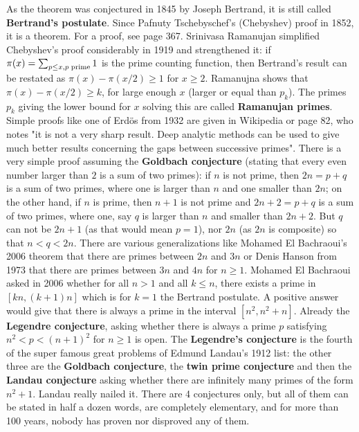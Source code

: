 \documentclass[12pt]{amsart}
\begin{document}
As the theorem was conjectured in 1845 by Joseph Bertrand, it is still called {\bf Bertrand's postulate}.
Since Pafnuty Tschebyschef's (Chebyshev) proof in 1852, it is a theorem.
For a proof, see \cite{NivenZuckermanMontgomery}  page 367.
Srinivasa Ramanujan simplified Chebyshev's proof considerably in 1919 and strengthened
it: if $\pi(x) = \sum_{p \leq x, p \; {\rm prime}} 1$ is the {\rm prime counting function}, then
Bertrand's result can be restated as $\pi(x)-\pi(x/2) \geq 1$ for $x \geq 2$.
Ramanujna shows that $\pi(x)-\pi(x/2) \geq k$, for large enough $x$ (larger or equal than $p_k$).
The primes $p_k$ giving the lower bound for $x$ solving this are called {\bf Ramanujan primes}.
Simple proofs like one of Erd\"os from 1932 are given in Wikipedia or
\cite{Hua1982} page 82, who notes "it is not a very sharp result. Deep analytic
methods can be used to give much better results concerning the gaps between successive primes".
There is a very simple proof assuming the {\bf Goldbach conjecture} (stating that
every even number larger than $2$ is a sum of two primes): \cite{RicardoGoldbach}
if $n$ is not prime, then $2n=p+q$ is a sum of two primes, where one
is larger than $n$ and one smaller than $2n$; on the other hand, if $n$ is prime, 
then $n+1$ is not prime and $2n+2=p+q$ is a sum of two primes, where one, say
$q$ is larger than $n$ and smaller than $2n+2$. But $q$ can not be $2n+1$ (as
that would mean $p=1$), nor $2n$ (as $2n$ is composite) so that $n<q<2n$. 
There are various generalizations like Mohamed El Bachraoui's 2006 theorem that there are primes
between $2n$ and $3n$ or Denis Hanson from 1973 \cite{Hanson1973} that there are primes
between $3n$ and $4n$ for $n \geq 1$. Mohamed El Bachraoui asked in 2006 whether
for all $n>1$ and all $k \leq n$, there exists a prime in $[kn,(k+1)n]$ which is
for $k=1$ the Bertrand postulate. A positive answer would give that there is always 
a prime in the interval $[n^2,n^2+n]$. Already the {\bf Legendre conjecture}, asking
whether there is always a prime $p$ satisfying $n^2<p<(n+1)^2$ for $n \geq 1$ is open.
The {\bf Legendre's conjecture} is the fourth of the super famous great problems of Edmund Landau's 1912 list:
the other three are the {\bf Goldbach conjecture}, the {\bf twin prime conjecture} and then the
{\bf Landau conjecture} asking whether there are infinitely many primes of the form $n^2+1$.
Landau really nailed it. There are 4 conjectures only, but all of them can be stated in half
a dozen words, are completely elementary, and for more than 100 years, 
nobody has proven nor disproved any of them. 
\end{document}
